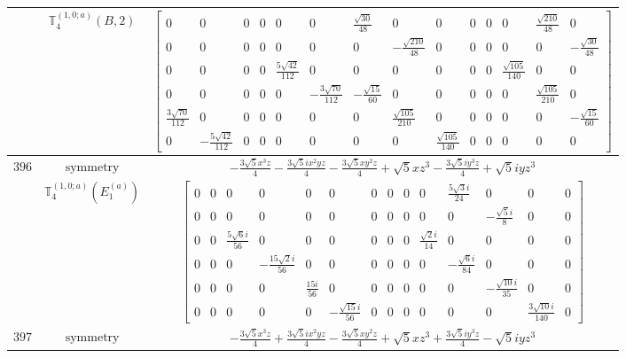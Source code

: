 \documentclass[fleqn,8pt,landscape]{jsarticle}
\begin{document}
\begin{longtable}{ccc}
$  $ & $ \mathbb{T}_{4}^{(1,0;a)}(B,2) $ & $ \begin{bmatrix} 0 & 0 & 0 & 0 & 0 & 0 & \frac{\sqrt{30}}{48} & 0 & 0 & 0 & 0 & 0 & \frac{\sqrt{210}}{48} & 0 \\ 0 & 0 & 0 & 0 & 0 & 0 & 0 & - \frac{\sqrt{210}}{48} & 0 & 0 & 0 & 0 & 0 & - \frac{\sqrt{30}}{48} \\ 0 & 0 & 0 & 0 & \frac{5 \sqrt{42}}{112} & 0 & 0 & 0 & 0 & 0 & 0 & \frac{\sqrt{105}}{140} & 0 & 0 \\ 0 & 0 & 0 & 0 & 0 & - \frac{3 \sqrt{70}}{112} & - \frac{\sqrt{15}}{60} & 0 & 0 & 0 & 0 & 0 & \frac{\sqrt{105}}{210} & 0 \\ \frac{3 \sqrt{70}}{112} & 0 & 0 & 0 & 0 & 0 & 0 & \frac{\sqrt{105}}{210} & 0 & 0 & 0 & 0 & 0 & - \frac{\sqrt{15}}{60} \\ 0 & - \frac{5 \sqrt{42}}{112} & 0 & 0 & 0 & 0 & 0 & 0 & \frac{\sqrt{105}}{140} & 0 & 0 & 0 & 0 & 0 \end{bmatrix} $ \\ \hline
$ 396 $ & $ \text{symmetry} $ & $ - \frac{3 \sqrt{5} x^{3} z}{4} - \frac{3 \sqrt{5} i x^{2} y z}{4} - \frac{3 \sqrt{5} x y^{2} z}{4} + \sqrt{5} x z^{3} - \frac{3 \sqrt{5} i y^{3} z}{4} + \sqrt{5} i y z^{3} $ \\
$  $ & $ \mathbb{T}_{4}^{(1,0;a)}(E_{1}^{(a)}) $ & $ \begin{bmatrix} 0 & 0 & 0 & 0 & 0 & 0 & 0 & 0 & 0 & 0 & \frac{5 \sqrt{3} i}{24} & 0 & 0 & 0 \\ 0 & 0 & 0 & 0 & 0 & 0 & 0 & 0 & 0 & 0 & 0 & - \frac{\sqrt{5} i}{8} & 0 & 0 \\ 0 & 0 & \frac{5 \sqrt{6} i}{56} & 0 & 0 & 0 & 0 & 0 & 0 & \frac{\sqrt{2} i}{14} & 0 & 0 & 0 & 0 \\ 0 & 0 & 0 & - \frac{15 \sqrt{2} i}{56} & 0 & 0 & 0 & 0 & 0 & 0 & - \frac{\sqrt{6} i}{84} & 0 & 0 & 0 \\ 0 & 0 & 0 & 0 & \frac{15 i}{56} & 0 & 0 & 0 & 0 & 0 & 0 & - \frac{\sqrt{10} i}{35} & 0 & 0 \\ 0 & 0 & 0 & 0 & 0 & - \frac{\sqrt{15} i}{56} & 0 & 0 & 0 & 0 & 0 & 0 & \frac{3 \sqrt{10} i}{140} & 0 \end{bmatrix} $ \\ \hline
$ 397 $ & $ \text{symmetry} $ & $ - \frac{3 \sqrt{5} x^{3} z}{4} + \frac{3 \sqrt{5} i x^{2} y z}{4} - \frac{3 \sqrt{5} x y^{2} z}{4} + \sqrt{5} x z^{3} + \frac{3 \sqrt{5} i y^{3} z}{4} - \sqrt{5} i y z^{3} $ \\

\end{longtable}
\end{document}
